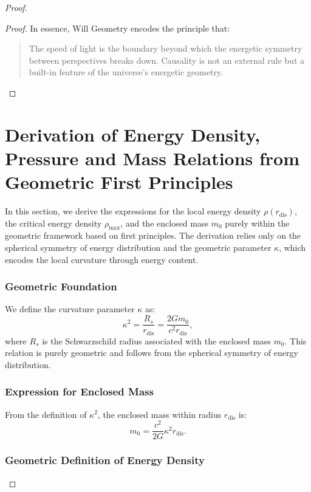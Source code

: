 \documentclass{article}
\begin{document}
\begin{theorem}
\begin{proof}
\begin{proof}
In essence, Will Geometry encodes the principle that:
\begin{quote}
The speed of light is the boundary beyond which the energetic symmetry between perspectives breaks down. Causality is not an external rule but a built-in feature of the universe's energetic geometry.
\end{quote}
\end{proof}


\section{Derivation of Energy Density, Pressure and Mass Relations from Geometric First Principles}

In this section, we derive the expressions for the local energy density $\rho(r_{\text{dis}})$, the critical energy density $\rho_{\text{max}}$, and the enclosed mass $m_0$ purely within the geometric framework based on first principles. The derivation relies only on the spherical symmetry of energy distribution and the geometric parameter $\kappa$, which encodes the local curvature through energy content.

\subsubsection{Geometric Foundation}

We define the curvature parameter $\kappa$ as:
\begin{equation}
\kappa^2 = \frac{R_s}{r_{\text{dis}}} = \frac{2G m_0}{c^2 r_{\text{dis}}},
\end{equation}
where $R_s$ is the Schwarzschild radius associated with the enclosed mass $m_0$. This relation is purely geometric and follows from the spherical symmetry of energy distribution.

\subsubsection{Expression for Enclosed Mass}

From the definition of $\kappa^2$, the enclosed mass within radius $r_{\text{dis}}$ is:
\begin{equation}
m_0 = \frac{c^2}{2G} \kappa^2 r_{\text{dis}}.
\end{equation}
\subsubsection{Geometric Definition of Energy Density}


\end{proof}
\end{theorem}
\end{document}
